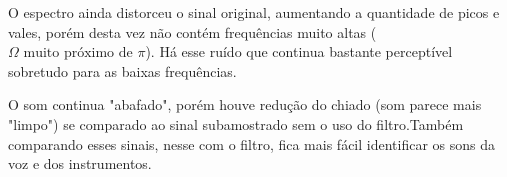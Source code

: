 \documentclass{article}
\begin{document}
\begin{enumerate}[(a)]
    O espectro ainda distorceu o sinal original, aumentando a quantidade de picos e vales, porém desta vez não contém frequências muito altas ($\Omega \text{ muito próximo de } \pi$). Há esse ruído que continua bastante perceptível sobretudo para as baixas frequências.

    O som continua "abafado", porém houve redução do chiado (som parece mais "limpo") se comparado ao sinal subamostrado sem o uso do filtro.Também comparando esses sinais, nesse com o filtro, fica mais fácil identificar os sons da voz e dos instrumentos.

\end{enumerate}
\end{document}
